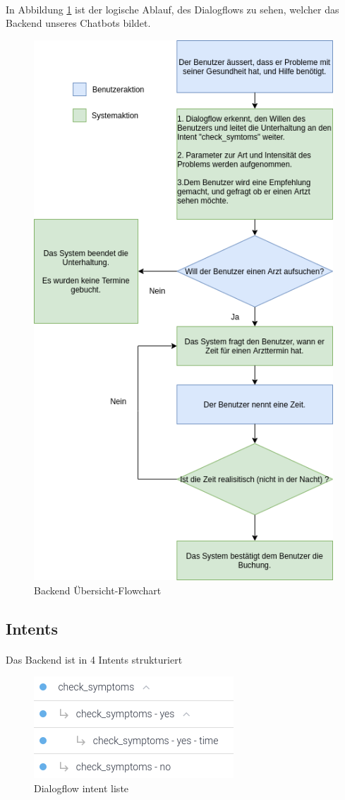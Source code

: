 \documentclass[11pt,a4paper]{article}
\begin{document}
        \paragraph{}
        In Abbildung \ref{fig:backEndFlowChart} ist der logische Ablauf, des Dialogflows zu sehen, welcher das
        Backend unseres Chatbots bildet.
        \begin{figure}[h!]
            \begin{center}
                \includegraphics[width=0.6\linewidth]{backendOverview.png}
                \caption{Backend Übersicht-Flowchart}
                \label{fig:backEndFlowChart}
            \end{center}
        \end{figure}
        \newpage

    \subsection{Intents}
        \paragraph{}
            Das Backend ist in 4 Intents strukturiert
            \begin{figure}[h!]
                \begin{center}
                    \includegraphics[width=0.5\linewidth]{intents.png}
                    \caption{Dialogflow intent liste}
                    \label{fig:intentslist}
                \end{center}
            \end{figure}
\end{document}
